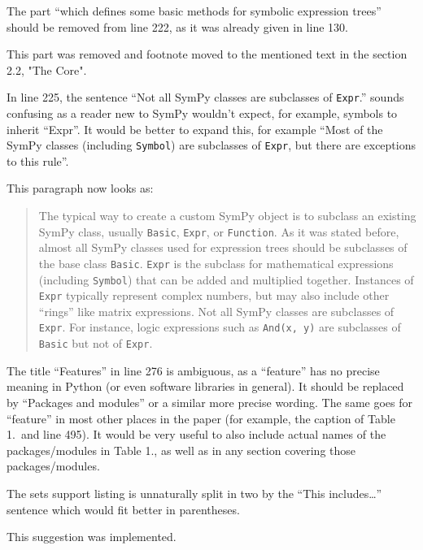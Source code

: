 \documentclass[answers,12pt]{exam}
\begin{document}
\begin{questions}
\question The part ``which defines some basic methods for symbolic expression trees'' should be removed from line 222, as it was already given in line 130.
\begin{solution}
This part was removed and footnote moved to the mentioned
text in the section 2.2, "The Core".
\end{solution}

\question In line 225, the sentence ``Not all SymPy classes are subclasses of \texttt{Expr}.'' sounds confusing as a reader new to SymPy wouldn't expect, for example, symbols to inherit ``Expr''. It would be better to expand this, for example ``Most of the SymPy classes (including \texttt{Symbol}) are subclasses of \texttt{Expr}, but there are exceptions to this rule''.
\begin{solution}
This paragraph now looks as:
\begin{quote}
The typical way to create a custom SymPy object is to subclass an existing
SymPy class, usually  \texttt{Basic}, \texttt{Expr}, or
\texttt{Function}. As it was stated before, almost all SymPy classes used for
expression trees should be subclasses of the base class \texttt{Basic}.
\texttt{Expr} is the subclass for mathematical expressions (including \texttt{Symbol}) that can be
added and multiplied together. Instances of \texttt{Expr} typically represent
complex numbers, but may also include other ``rings'' like matrix expressions.
Not all SymPy classes are subclasses of \texttt{Expr}. For instance, logic expressions such
as \verb|And(x, y)| are subclasses of \texttt{Basic} but not of \texttt{Expr}.
\end{quote}
\end{solution}

\question The title ``Features'' in line 276 is ambiguous, as a ``feature''
has no precise meaning in Python (or even software libraries in general). It
should be replaced by ``Packages and modules'' or a similar more precise
wording. The same goes for ``feature'' in most other places in the paper (for
example, the caption of Table 1.\ and line 495). It would be very useful to also include actual names of the packages/modules in Table 1., as well as in any section covering those packages/modules.
\begin{solution}

\end{solution}

\question The sets support listing is unnaturally split in two by the ``This includes\ldots'' sentence which would fit better in parentheses.
\begin{solution}
This suggestion was implemented.
\end{solution}


\end{questions}
\end{document}
